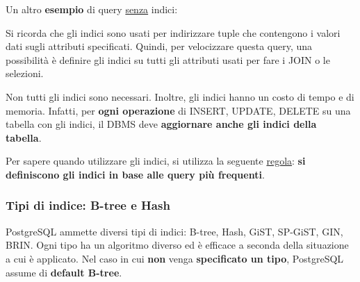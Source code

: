 \documentclass[a4paper]{article}
\begin{document}
	\noindent
	Un altro \textcolor{Green4}{\textbf{esempio}} di query \underline{senza} indici:
	
	Si ricorda che gli indici sono usati per indirizzare tuple che contengono i valori dati sugli attributi specificati. Quindi, per velocizzare questa query, una possibilità è definire gli indici su tutti gli attributi usati per fare i JOIN o le selezioni.
	\:\newline

	\noindent
	Non tutti gli indici sono necessari. Inoltre, gli indici hanno un costo di tempo e di memoria.
	Infatti, per \textbf{ogni operazione} di \textsf{INSERT}, \textsf{UPDATE}, \textsf{DELETE} su una tabella con gli indici, il DBMS deve \textbf{aggiornare anche gli indici della tabella}.\newline

	\noindent
	Per sapere quando utilizzare gli indici, si utilizza la seguente \underline{regola}: \textbf{si definiscono gli indici in base alle query più frequenti}.\newpage
	
	\subsubsection{Tipi di indice: B-tree e Hash}
	
	PostgreSQL ammette diversi tipi di indici: B-tree, Hash, GiST, SP-GiST, GIN, BRIN. Ogni tipo ha un algoritmo diverso ed è efficace a seconda della situazione a cui è applicato. Nel caso in cui \textbf{non} venga \textbf{specificato un tipo}, PostgreSQL assume di \textbf{default B-tree}.\newline
	
\end{document}
